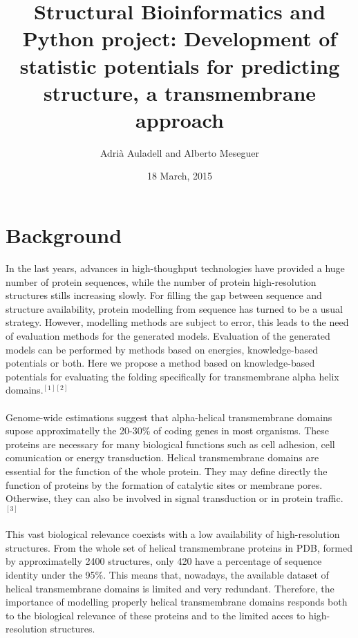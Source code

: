 \documentclass[12pt,titlepage]{article}
\theoremstyle{supercalifragilisticexpialidocious}
\begin{document}
\title{\textbf{Structural Bioinformatics and Python project: Development of statistic potentials for predicting structure, a transmembrane approach }}
\author{Adrià Auladell and Alberto Meseguer}
\date{18 March, 2015 }
\maketitle %

\section{Background }


In the last years, advances in high-thoughput technologies have provided a huge number of protein sequences, while the number of protein high-resolution structures stills increasing slowly. For filling the gap between sequence and structure availability, protein modelling from sequence has turned to be a usual strategy. However, modelling methods are subject to error, this leads to the need of evaluation methods for the generated models. Evaluation of the generated models can be performed by methods based on energies, knowledge-based potentials or both. Here we propose a method based on knowledge-based potentials for evaluating the folding specifically for transmembrane alpha helix domains.$^{[1][2]}$
\\ \\
Genome-wide estimations suggest that alpha-helical transmembrane domains supose approximatelly the 20-30\% of coding genes in most organisms. These proteins are necessary for many biological functions such as cell adhesion, cell comunication or energy transduction. Helical transmembrane domains are essential for the function of the whole protein. They may define directly the function of proteins by the formation of catalytic sites or membrane pores. Otherwise, they can also be involved in signal transduction or in protein traffic.$^{[3]}$
\\ \\
This vast biological relevance coexists with a low availability of high-resolution structures. From the whole set of helical transmembrane proteins in PDB, formed by approximatelly 2400 structures, only 420 have a percentage of sequence identity under the 95\%. This means that, nowadays, the available dataset of helical transmembrane domains is limited and very redundant. Therefore, the importance of modelling properly helical transmembrane domains responds both to the biological relevance of these proteins and to the limited acces to high-resolution structures.
\end{document}
